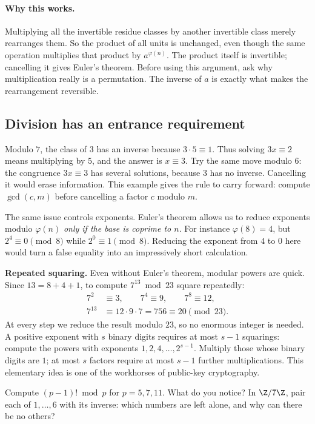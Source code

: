 \paragraph{Why this works.}
Multiplying all the invertible residue classes by another invertible class merely rearranges them. So the product of all units is unchanged, even though the same operation multiplies that product by $a^{\varphi(n)}$. The product itself is invertible; cancelling it gives Euler's theorem. Before using this argument, ask why multiplication really is a permutation. The inverse of $a$ is exactly what makes the rearrangement reversible.

\subsection*{Division has an entrance requirement}
Modulo $7$, the class of $3$ has an inverse because $3\cdot5\equiv1$. Thus solving $3x\equiv2$ means multiplying by $5$, and the answer is $x\equiv3$. Try the same move modulo $6$: the congruence $3x\equiv3$ has several solutions, because $3$ has no inverse. Cancelling it would erase information. This example gives the rule to carry forward: compute $\gcd(c,m)$ before cancelling a factor $c$ modulo $m$.

The same issue controls exponents. Euler's theorem allows us to reduce exponents modulo $\varphi(n)$ \emph{only if the base is coprime to $n$}. For instance $\varphi(8)=4$, but $2^4\equiv0\pmod8$ while $2^0\equiv1\pmod8$. Reducing the exponent from $4$ to $0$ here would turn a false equality into an impressively short calculation.

\textbf{Repeated squaring.} Even without Euler's theorem, modular powers are quick. Since $13=8+4+1$, to compute $7^{13}\bmod23$ square repeatedly:
\[
\begin{aligned}
7^2&\equiv3,\qquad 7^4\equiv9,\qquad 7^8\equiv12,\\
7^{13}&\equiv12\cdot9\cdot7=756\equiv20\pmod{23}.
\end{aligned}
\]
At every step we reduce the result modulo $23$, so no enormous integer is needed. A positive exponent with $s$ binary digits requires at most $s-1$ squarings: compute the powers with exponents $1,2,4,\ldots,2^{s-1}$. Multiply those whose binary digits are $1$; at most $s$ factors require at most $s-1$ further multiplications. This elementary idea is one of the workhorses of public-key cryptography.

\begin{think}
Compute $(p-1)!\bmod p$ for $p=5,7,11$. What do you notice? In $\Z/7\Z$, pair each of $1,\dots,6$ with its inverse: which numbers are left alone, and why can there be no others?
\end{think}

